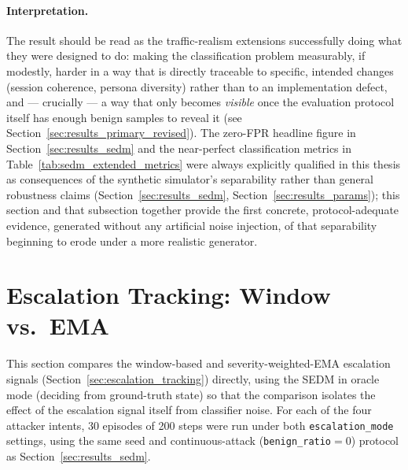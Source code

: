 \paragraph{Interpretation.}
The result should be read as the traffic-realism extensions successfully
doing what they were designed to do: making the classification problem
measurably, if modestly, harder in a way that is directly traceable to
specific, intended changes (session coherence, persona diversity) rather
than to an implementation defect, and — crucially — a way that only becomes
\emph{visible} once the evaluation protocol itself has enough benign
samples to reveal it (see Section~\ref{sec:results_primary_revised}). The
zero-FPR headline figure in Section~\ref{sec:results_sedm} and the
near-perfect classification metrics in Table~\ref{tab:sedm_extended_metrics}
were always explicitly qualified in this thesis as consequences of the
synthetic simulator's separability rather than general robustness claims
(Section~\ref{sec:results_sedm}, Section~\ref{sec:results_params}); this
section and that subsection together provide the first concrete,
protocol-adequate evidence, generated without any artificial noise
injection, of that separability beginning to erode under a more realistic
generator.

\section{Escalation Tracking: Window vs.\ EMA}
\label{sec:results_escalation_mode}

This section compares the window-based and severity-weighted-EMA escalation
signals (Section~\ref{sec:escalation_tracking}) directly, using the SEDM in
oracle mode (deciding from ground-truth state) so that the comparison
isolates the effect of the escalation signal itself from classifier noise.
For each of the four attacker intents, 30 episodes of 200 steps were run
under both \texttt{escalation\_mode} settings, using the same seed and
continuous-attack (\texttt{benign\_ratio}$=0$) protocol as
Section~\ref{sec:results_sedm}.

